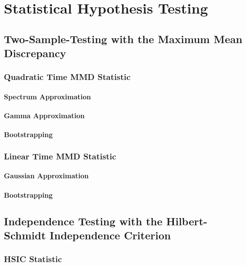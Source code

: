 \chapter{Statistical Hypothesis Testing}

\section{Two-Sample-Testing with the Maximum Mean Discrepancy}

\subsection{Quadratic Time MMD Statistic}

\subsubsection{Spectrum Approximation}
\subsubsection{Gamma Approximation}
\subsubsection{Bootstrapping}

\subsection{Linear Time MMD Statistic}
\subsubsection{Gaussian Approximation}
\subsubsection{Bootstrapping}

\section{Independence Testing with the Hilbert-Schmidt Independence Criterion}

\subsection{HSIC Statistic}